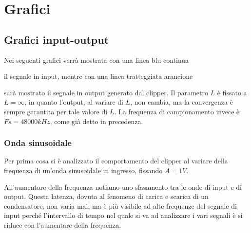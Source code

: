 	\section{Grafici}
		\subsection{Grafici input-output}
			\label{graphs:input-output}
			Nei seguenti grafici verrà mostrata con una linea blu continua
			il segnale in \textcolor{matlab_blue}{input}, mentre con una linea tratteggiata arancione
			sarà mostrato il segnale in \textcolor{matlab_orange}{output} generato dal clipper. Il parametro $L$ è fissato a $L = \infty$, in quanto l'output, al variare di $L$, non cambia, ma la convergenza è sempre garantita per tale valore di $L$. La frequenza di campionamento invece è $Fs = 48000kHz$, come già detto in precedenza.\\
		
			\subsubsection{Onda sinusoidale}
				Per prima cosa si è analizzato il comportamento del clipper al variare della frequenza di un'onda sinusoidale in ingresso, fissando $A = 1V$.
				\graficospace
				\graficospace
				\graficospace
				\graficospace
				\graficospace
				
				All'aumentare della frequenza notiamo uno sfasamento tra le onde di input e di output. Questa latenza, dovuta al fenomeno di carica e scarica di un condensatore, non varia mai, ma è più visibile ad alte frequenze del segnale di input perché l'intervallo di tempo nel quale si va ad analizzare i vari segnali è si riduce con l'aumentare della frequenza.
				
